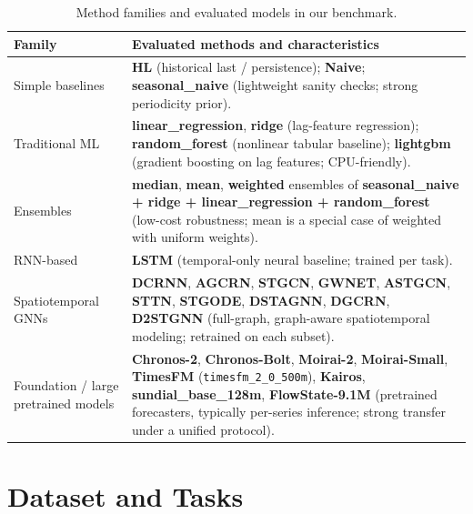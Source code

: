 \documentclass[10pt]{article}
\begin{document}
\begin{table}[t]
\centering
\caption{Method families and evaluated models in our benchmark.}
\label{tab:method_families}
\begin{tabular}{p{2.7cm}p{9.0cm}}
\toprule
Family & Evaluated methods and characteristics \\
\midrule
Simple baselines
& \textbf{HL} (historical last / persistence); \textbf{Naive}; \textbf{seasonal\_naive} (lightweight sanity checks; strong periodicity prior). \\

Traditional ML
& \textbf{linear\_regression}, \textbf{ridge} (lag-feature regression); \textbf{random\_forest} (nonlinear tabular baseline);
\textbf{lightgbm} (gradient boosting on lag features; CPU-friendly). \\

Ensembles
& \textbf{median}, \textbf{mean}, \textbf{weighted} ensembles of \textbf{seasonal\_naive + ridge + linear\_regression + random\_forest}
(low-cost robustness; mean is a special case of weighted with uniform weights). \\

RNN-based
& \textbf{LSTM} (temporal-only neural baseline; trained per task). \\

Spatiotemporal GNNs
& \textbf{DCRNN}, \textbf{AGCRN}, \textbf{STGCN}, \textbf{GWNET}, \textbf{ASTGCN}, \textbf{STTN}, \textbf{STGODE}, \textbf{DSTAGNN}, \textbf{DGCRN}, \textbf{D2STGNN}
(full-graph, graph-aware spatiotemporal modeling; retrained on each subset). \\

Foundation / large pretrained models
& \textbf{Chronos-2}, \textbf{Chronos-Bolt}, \textbf{Moirai-2}, \textbf{Moirai-Small}, \textbf{TimesFM} (\texttt{timesfm\_2\_0\_500m}),
\textbf{Kairos}, \textbf{sundial\_base\_128m}, \textbf{FlowState-9.1M}
(pretrained forecasters, typically per-series inference; strong transfer under a unified protocol). \\
\bottomrule
\end{tabular}
\end{table}



\section{Dataset and Tasks}
\label{sec:data}
\end{document}
